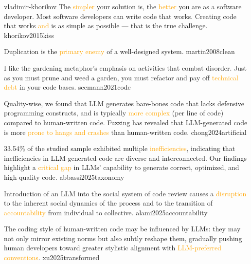 \documentclass{article}
\renewcommand\ul[1]{\textcolor{orange}{#1}}
\begin{document}

\lnQuote
  {vladimir-khorikov}
  {The \ul{simpler} your solution is, the \ul{better} you are as a software developer. Most software developers can write code that works. Creating code that works \ul{and} is as simple as possible --- that is the true challenge.}
  {khorikov2015kiss}

  {Duplication is the \ul{primary enemy} of a well-designed system.}
  {martin2008clean}

  {I like the gardening metaphor's emphasis on activities that combat disorder. Just as you must prune and weed a garden, you must refactor and pay off \ul{technical debt} in your code bases.}
  {seemann2021code}



  {Quality-wise, we found that LLM generates bare-bones code that lacks defensive programming constructs, and is typically \ul{more complex} (per line of code) compared to human-written code. Fuzzing has revealed that LLM-generated code is more \ul{prone to hangs and crashes} than human-written code.}
  {chong2024artificial}

  {33.54\% of the studied sample exhibited multiple \ul{inefficiencies}, indicating that inefficiencies in LLM-generated code are diverse and interconnected. Our findings highlight a \ul{critical gap} in LLMs' capability to generate correct, optimized, and high-quality code.}
  {abbassi2025taxonomy}

  {Introduction of an LLM into the social system of code review causes a \ul{disruption} to the inherent social dynamics of the process and to the transition of \ul{accountability} from individual to collective.}
  {alami2025accountability}


  {The coding style of human-written code may be influenced by LLMs: they may not only mirror existing norms but also subtly reshape them, gradually pushing human developers toward greater stylistic alignment with \ul{LLM-preferred conventions}.}
  {xu2025transformed}
\end{document}
